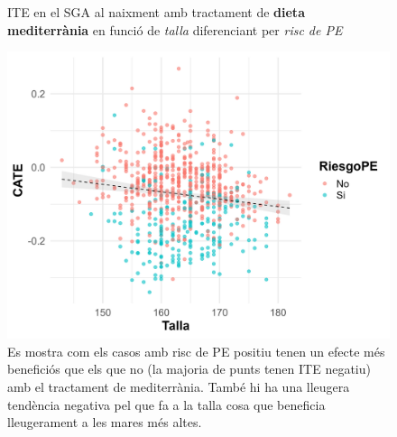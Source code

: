 \documentclass[../main.tex]{subfiles}
\begin{document}
\begin{figure}[H]
      \begin{minipage}[t]{0.48\textwidth}
        \captionsetup{font=small}
        \caption*{\centering ITE en el SGA al naixment amb tractament de \textbf{dieta mediterrània} en funció de \textit{talla} diferenciant per \textit{risc de PE}}
        \includegraphics[width=\textwidth]{imgs/scaterplots/scater_SGAnaix_2_TallaRiscPE.jpg}
        \captionsetup{font=footnotesize}
        \caption{Es mostra com els casos amb risc de PE positiu tenen un efecte més beneficiós que els que no (la majoria de punts tenen ITE negatiu) amb el tractament de mediterrània. També hi ha una lleugera tendència negativa pel que fa a la talla cosa que beneficia lleugerament a les mares més altes.}
        \label{plot:SGAnaix2}
      \end{minipage}
    \end{figure}
\end{document}
